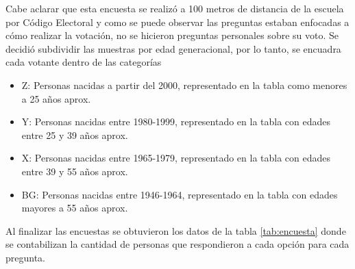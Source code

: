 Cabe aclarar que esta encuesta se realizó a 100 metros de distancia de la escuela por Código Electoral y como se puede observar las preguntas estaban enfocadas a cómo realizar la votación, no se hicieron preguntas personales sobre su voto. Se decidió subdividir las muestras por edad generacional, por lo tanto, se encuadra cada votante dentro de las categorías
\begin{itemize}
    \item Z: Personas nacidas a partir del 2000, representado en la tabla como menores a 25 años aprox.
    \item Y: Personas nacidas entre 1980-1999, representado en la tabla con edades entre 25 y 39 años aprox.
    \item X: Personas nacidas entre 1965-1979, representado en la tabla con edades entre 39 y 55 años aprox.
    \item BG: Personas nacidas entre 1946-1964, representado en la tabla con edades mayores a 55 años aprox.
\end{itemize}
Al finalizar las encuestas se obtuvieron los datos de la tabla \ref{tab:encuesta} donde se contabilizan la cantidad de personas que respondieron a cada opción para cada pregunta.
